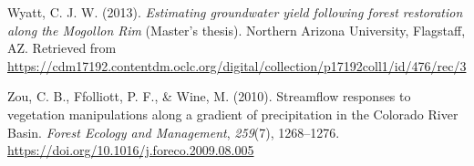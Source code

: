 \documentclass[
]{agujournal2019}
\newlength{\cslhangindent}
\newenvironment{CSLReferences}[2] %
 {\begin{list}{}{%
  \setlength{\itemindent}{0pt}
  \setlength{\leftmargin}{0pt}
  \setlength{\parsep}{0pt}
  \ifodd #1
   \setlength{\leftmargin}{\cslhangindent}
   \setlength{\itemindent}{-1\cslhangindent}
  \fi
  \setlength{\itemsep}{#2\baselineskip}}}
 {\end{list}}
\begin{document}
\begin{CSLReferences}{1}{0}
Wyatt, C. J. W. (2013). \emph{Estimating groundwater yield following
forest restoration along the {Mogollon} {Rim}} (Master's thesis).
Northern Arizona University, Flagstaff, AZ. Retrieved from
\url{https://cdm17192.contentdm.oclc.org/digital/collection/p17192coll1/id/476/rec/3}

Zou, C. B., Ffolliott, P. F., \& Wine, M. (2010). Streamflow responses
to vegetation manipulations along a gradient of precipitation in the
{Colorado} {River} {Basin}. \emph{Forest Ecology and Management},
\emph{259}(7), 1268--1276.
\url{https://doi.org/10.1016/j.foreco.2009.08.005}

\end{CSLReferences}
\end{document}
